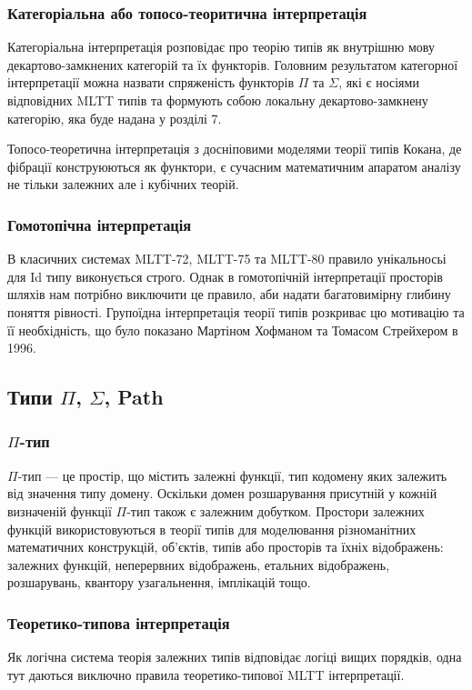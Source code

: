 \subsubsection{Категоріальна або топосо-теоритична інтерпретація}
Категоріальна інтерпретація розповідає про теорію типів як внутрішню мову
декартово-замкнених категорій та їх функторів. Головним результатом
категорної інтерпретації можна назвати спряженість функторів $\Pi$ та $\Sigma$,
які є носіями відповідних MLTT типів та формують собою локальну
декартово-замкнену категорію, яка буде надана у розділі 7.

Топосо-теоретична інтерпретація з досніповими моделями теорії типів Кокана,
де фібрації конструюються як функтори, є сучасним математичним апаратом
аналізу не тільки залежних але і кубічних теорій.

\subsubsection{Гомотопічна інтерпретація}
В класичних системах MLTT-72, MLTT-75 та MLTT-80 правило унікальносьі для
Id типу виконується строго. Однак в гомотопічній інтерпретації просторів шляхів
нам потрібно виключити це правило, аби надати багатовимірну глибину поняття рівності.
Групоїдна інтерпретація теорії типів розкриває цю мотивацію та її необхідність, що
було показано Мартіном Хофманом та Томасом Стрейхером в 1996.

\newpage
\subsection{Типи $\Pi$, $\Sigma$, \textbf{Path}}

\subsubsection{$\Pi$-тип}
$\Pi$-тип --- це простір, що містить залежні функції, тип кодомену
яких залежить від значення типу домену. Оскільки домен розшарування
присутній у кожній визначеній функції $\Pi$-тип також є залежним добутком.
Простори залежних функцій використовуються в теорії типів для моделювання
різноманітних математичних конструкцій, об’єктів, типів або
просторів та їхніх відображень: залежних функцій, неперервних відображень,
етальних відображень, розшарувань, квантору узагальнення, імплікацій тощо.

\subsubsection*{Теоретико-типова інтерпретація}
Як логічна система теорія залежних типів відповідає логіці вищих порядків,
одна тут даються виключно правила теоретико-типової MLTT інтерпретації.

